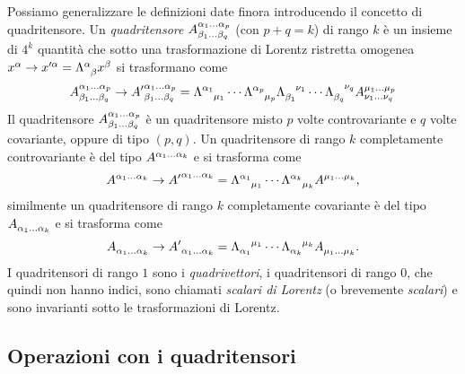Possiamo generalizzare le definizioni date finora introducendo il concetto di
quadritensore.  Un \emph{quadritensore}
$\tensor*{A}{^{\alpha_{1}\dots\alpha_{p}}_{\beta_{1}\dots\beta_{q}}}$ (con
$p + q = k$) di rango $k$ è un insieme di $4^{k}$ quantità che sotto una
trasformazione di Lorentz ristretta omogenea
$x^{\alpha} \to x'^{\alpha} = \tensor{\Lambda}{^{\alpha}_{\beta}}x^{\beta}$ si
trasformano come
\begin{equation}
  \tensor*{A}{^{\alpha_{1}\dots\alpha_{p}}_{\beta_{1}\dots\beta_{q}}} \to
  \tensor*{{A'}}{^{\alpha_{1}\dots\alpha_{p}}_{\beta_{1}\dots\beta_{q}}} =
  \tensor{\Lambda}{^{\alpha_{1}}_{\mu_{1}}} \cdots
  \tensor{\Lambda}{^{\alpha_{p}}_{\mu_{p}}}
  \tensor{\Lambda}{_{\beta_{1}}^{\nu_{1}}} \cdots
  \tensor{\Lambda}{_{\beta_{q}}^{\nu_{q}}}
  \tensor*{A}{^{\mu_{1}\dots\mu_{p}}_{\nu_{1}\dots\nu_{q}}}
\end{equation}
Il quadritensore
$\tensor*{A}{^{\alpha_{1}\dots\alpha_{p}}_{\beta_{1}\dots\beta_{q}}}$ è un
quadritensore misto $p$ volte controvariante e $q$ volte covariante, oppure di
tipo $(p,q)$.  Un quadritensore di rango $k$ completamente controvariante è del
tipo $\tensor{A}{^{\alpha_{1}\dots\alpha_{k}}}$ e si trasforma come
\begin{equation}
  \tensor{A}{^{\alpha_{1}\dots\alpha_{k}}} \to
  \tensor{{A'}}{^{\alpha_{1}\dots\alpha_{k}}} =
  \tensor{\Lambda}{^{\alpha_{1}}_{\mu_{1}}} \cdots
  \tensor{\Lambda}{^{\alpha_{k}}_{\mu_{k}}} \tensor{A}{^{\mu_{1}\dots\mu_{k}}},
\end{equation}
similmente un quadritensore di rango $k$ completamente covariante è del tipo
$\tensor{A}{_{\alpha_{1}\dots\alpha_{k}}}$ e si trasforma come
\begin{equation}
  \tensor{A}{_{\alpha_{1}\dots\alpha_{k}}} \to
  \tensor{{A'}}{_{\alpha_{1}\dots\alpha_{k}}} =
  \tensor{\Lambda}{_{\alpha_{1}}^{\mu_{1}}} \cdots
  \tensor{\Lambda}{_{\alpha_{k}}^{\mu_{k}}} \tensor{A}{_{\mu_{1}\dots\mu_{k}}}.
\end{equation}
I quadritensori di rango $1$ sono i \emph{quadrivettori}, i
quadritensori di rango $0$, che quindi non hanno indici, sono chiamati
\emph{scalari di Lorentz} (o brevemente
\emph{scalari}) e sono invarianti sotto le trasformazioni di Lorentz.

\subsection{Operazioni con i quadritensori}
\label{sec:operazioni-tensori}

